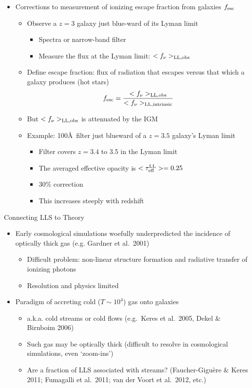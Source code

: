 \documentclass[12pt,letterpaper]{article}
\begin{document}
\begin{Aenumerate}
\begin{itemize}
  \item Corrections to measurement of ionizing escape 
  fraction from galaxies $f_{\rm esc}$
  	\begin{itemize}
  	\item Observe a $z=3$ galaxy just blue-ward of its Lyman limit
  		\begin{itemize}
  		\item Spectra or narrow-band filter
  		\item Measure the flux at the Lyman limit: $<f_\nu>_{\rm LL,obs}$
  		\end{itemize}
  	\item Define escape fraction: flux of radiation that escapes
  	versus that which a galaxy produces (hot stars)
  	\begin{equation}
  	f_{\rm esc} = \frac{<f_\nu>_{\rm LL,obs}}{
  	<f_\nu>_{\rm LL,intrinsic}}
  	\end{equation}
  	\item But $<f_\nu>_{\rm LL,obs}$ is attenuated by the IGM
  	\item Example: 100\AA\ filter just blueward of a $z=3.5$ galaxy's 
  	Lyman limit
  		\begin{itemize}
  		\item Filter covers $z=3.4$ to 3.5 in the Lyman limit
  		\item The averaged effective opacity is $<\tau_{\rm eff}^{\rm LL}> = 0.25$
  		\item 30\% correction
  		\item This increases steeply with redshift
  		\end{itemize}
  	\end{itemize}

  \end{itemize}

{\bf \item Connecting LLS to Theory}
  \begin{itemize}
  \item Early cosmological simulations woefully underpredicted
  the incidence of optically thick gas (e.g. Gardner et al.\ 2001)
  	\begin{itemize}
  	\item Difficult problem:  non-linear structure formation and
  	radiative transfer of ionizing photons
  	\item Resolution and physics limited
  	\end{itemize}
  \item Paradigm of accreting cold ($T \sim 10^4$) gas onto galaxies
  	\begin{itemize}
  	\item a.k.a. cold streams or cold flows (e.g.\ Keres et al.\ 2005, 
  	Dekel \& Birnboim 2006)
  	\item Such gas may be optically thick (difficult to resolve in 
  	cosmological simulations, even `zoom-ins')
  	\item Are a fraction of LLS associated with streams? 
  	(Faucher-Gigu\`ere \& Keres 2011; Fumagalli et al.\ 2011;
  	van der Voort et al.\ 2012, etc.)
  	\end{itemize}


\end{itemize}
\end{Aenumerate}
\end{document}
